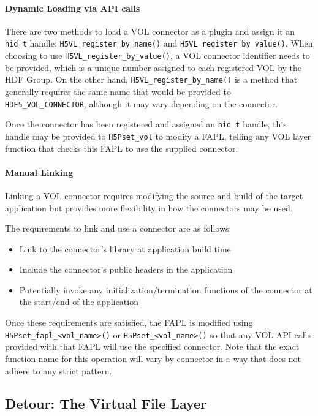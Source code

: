 \paragraph{Dynamic Loading via API calls} There are two methods to load a VOL connector as a plugin and assign it an \texttt{hid\_t} handle: \texttt{H5VL\_register\_by\_name()} and \texttt{H5VL\_register\_by\_value()}. When choosing to use \texttt{H5VL\_register\_by\_value()}, a VOL connector identifier needs to be provided, which is a unique number assigned to each registered VOL by the HDF Group.  On the other hand, \texttt{H5VL\_register\_by\_name()} is a method that generally requires the same name that would be provided to \texttt{HDF5\_VOL\_CONNECTOR}, although it may vary depending on the connector.

Once the connector has been registered and assigned an \texttt{hid\_t} handle, this handle may be provided to \texttt{H5Pset\_vol} to modify a FAPL, telling any VOL layer function that checks this FAPL to use the supplied connector.

\paragraph{Manual Linking} Linking a VOL connector requires modifying the source and build of the target application but provides more flexibility in how the connectors may be used. 

The requirements to link and use a connector are as follows:
\begin{itemize}
    \item Link to the connector's library at application build time
    \item Include the connector's public headers in the application
    \item Potentially invoke any initialization/termination functions of the connector at the start/end of the application
\end{itemize}

Once these requirements are satisfied, the FAPL is modified using  \texttt{H5Pset\_fapl\_<vol\_name>()} or \texttt{H5Pset\_<vol\_name>()} so that any VOL API calls provided with that FAPL will use the specified connector. Note that the exact function name for this operation will vary by connector in a way that does not adhere to any strict pattern.

\subsection{Detour: The Virtual File Layer}\label{sec:vfl}

